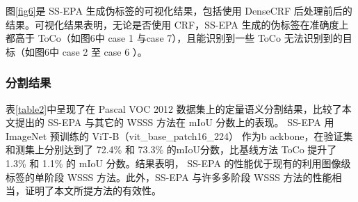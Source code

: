图\ref{fig6}是 SS-EPA 生成伪标签的可视化结果，包括使用 DenseCRF\cite{22chen2014semantic} 后处理前后的结果。可视化结果表明，无论是否使用 CRF，SS-EPA 生成的伪标签在准确度上都高于 ToCo（如图6中 case 1 与case 7），且能识别到一些 ToCo 无法识别到的目标（如图6中 case 2 至 case 6 ）。



\begin{CJK*}{UTF8}{zhhei}
    \subsubsection{分割结果}
\end{CJK*}

表\ref{table2}中呈现了在 Pascal VOC 2012 数据集上的定量语义分割结果，比较了本文提出的 SS-EPA 与其它的 WSSS 方法在 mIoU 分数上的表现。 SS-EPA 用ImageNet 预训练的 ViT-B（vit\_base\_patch16\_224） 作为b ackbone，在验证集和测集上分别达到了 72.4\% 和 73.3\% 的mIoU分数，比基线方法 ToCo 提升了 1.3\% 和 1.1\% 的 mIoU 分数。结果表明， SS-EPA 的性能优于现有的利用图像级标签的单阶段 WSSS 方法。此外，SS-EPA 与许多多阶段 WSSS 方法的性能相当，证明了本文所提方法的有效性。


    

